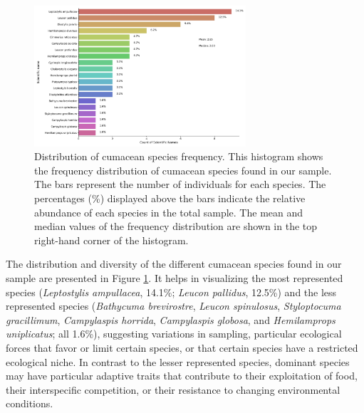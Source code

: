 \begin{figure}[htbp]
    \centering
    \includegraphics[width=0.7\textwidth]{figure2.jpg}
    \caption{Distribution of cumacean species frequency. This histogram shows the frequency distribution of cumacean species found in our sample. The bars represent the number of individuals for each species. The percentages (\%) displayed above the bars indicate the relative abundance of each species in the total sample. The mean and median values of the frequency distribution are shown in the top right-hand corner of the histogram. \label{fig:fig3}}
\end{figure}

The distribution and diversity of the different cumacean species found in our sample are presented in Figure \ref{fig:fig3}. It helps in visualizing the most represented species (\emph{Leptostylis ampullacea}, 14.1\%; \emph{Leucon pallidus}, 12.5\%) and the less represented species (\emph{Bathycuma brevirostre}, \emph{Leucon spinulosus}, \emph{Styloptocuma gracillimum}, \emph{Campylaspis horrida}, \emph{Campylaspis globosa}, and \emph{Hemilamprops uniplicatus}; all 1.6\%), suggesting variations in sampling, particular ecological forces that favor or limit certain species, or that certain species have a restricted ecological niche. In contrast to the lesser represented species, dominant species may have particular adaptive traits that contribute to their exploitation of food, their interspecific competition, or their resistance to changing environmental conditions.

